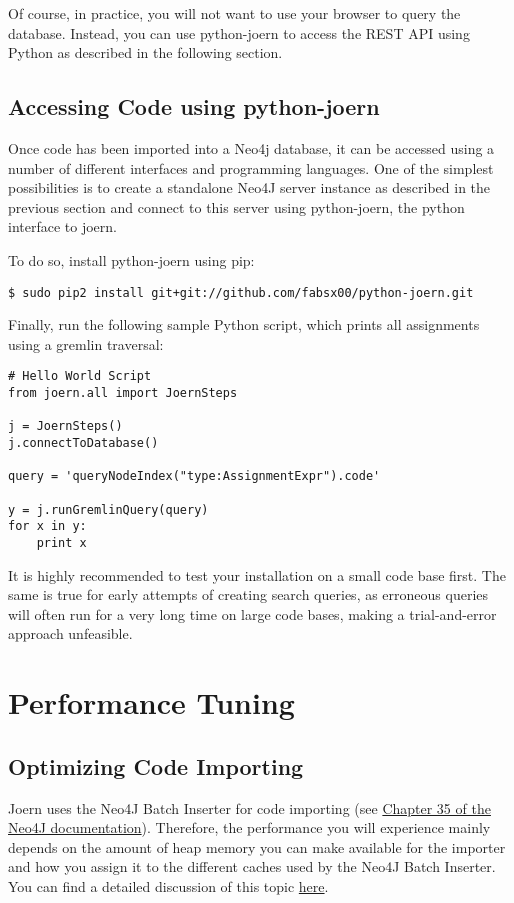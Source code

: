\documentclass[a4paper]{article}
\begin{document}
Of course, in practice, you will not want to use your browser to query
the database. Instead, you can use python-joern to access the REST
API using Python as described in the following section.

\subsection{Accessing Code using python-joern}

Once code has been imported into a Neo4j database, it can be accessed
using a number of different interfaces and programming languages. One
of the simplest possibilities is to create a standalone Neo4J server
instance as described in the previous section and connect to this
server using python-joern, the python interface to joern.

To do so, install python-joern using pip:

\begin{verbatim}
$ sudo pip2 install git+git://github.com/fabsx00/python-joern.git
\end{verbatim}

Finally, run the following sample Python script, which prints all
assignments using a gremlin traversal:

\begin{verbatim}
# Hello World Script
from joern.all import JoernSteps

j = JoernSteps()
j.connectToDatabase()

query = 'queryNodeIndex("type:AssignmentExpr").code'

y = j.runGremlinQuery(query)
for x in y:
    print x
\end{verbatim}

It is highly recommended to test your installation on a small code
base first. The same is true for early attempts of creating search
queries, as erroneous queries will often run for a very long time on
large code bases, making a trial-and-error approach unfeasible.

\section{Performance Tuning}
\label{sec:performance}

\subsection{Optimizing Code Importing}

Joern uses the Neo4J Batch Inserter for code importing (see
\href{http://docs.neo4j.org/chunked/stable/batchinsert.html}{Chapter
  35 of the Neo4J documentation}). Therefore, the performance you will
experience mainly depends on the amount of heap memory you can make
available for the importer and how you assign it to the different
caches used by the Neo4J Batch Inserter. You can find a detailed
discussion of this topic
\href{https://github.com/jexp/batch-import}{here}.
\end{document}
